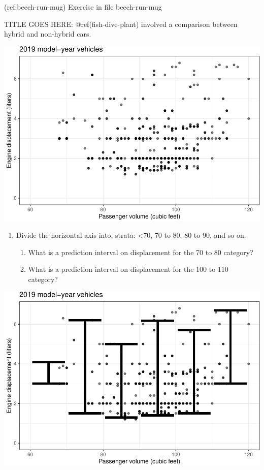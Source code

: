 \documentclass[]{article}
\title{}
\author{Daniel Kaplan}
\date{2018-12-19}
\providecommand{\tightlist}{%
  \setlength{\itemsep}{0pt}\setlength{\parskip}{0pt}}
\begin{document}
(ref:beech-run-mug) Exercise in file beech-run-mug

TITLE GOES HERE: @ref(fish-dive-plant) involved a comparison between
hybrid and non-hybrid cars.

\includegraphics[width=0.8\linewidth]{beech-run-mug_files/figure-latex/beech-run-mug-1-1}

\begin{enumerate}
\def\labelenumi{\arabic{enumi}.}
\tightlist
\item
  Divide the horizontal axis into, strata: \textless{}70, 70 to 80, 80
  to 90, and so on.

  \begin{enumerate}
  \def\labelenumii{\alph{enumii}.}
  \tightlist
  \item
    What is a prediction interval on displacement for the 70 to 80
    category?
  \item
    What is a prediction interval on displacement for the 100 to 110
    category?
  \end{enumerate}
\end{enumerate}

\includegraphics[width=0.8\linewidth]{beech-run-mug_files/figure-latex/beech-run-mug-2-1}
\end{document}
